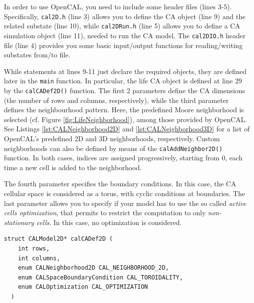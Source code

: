In order to use OpenCAL, you need to include some header files (lines
3-5). Specifically, \verb'cal2D.h' (line 3) allows you to define the
CA object (line 9) and the related substate (line 10), while
\verb'cal2DRun.h' (line 5) allows you to define a CA simulation object
(line 11), needed to run the CA model. The \verb'cal2DIO.h' header
file (line 4) provides you some basic input/output functions for
reading/writing substates from/to file.

While statements at lines 9-11 just declare the required objects, they
are defined later in the \verb'main' function. In particular, the life
CA object is defined at line 29 by the \verb'calCADef2D()'
function. The first 2 parameters define the CA dimensions (the number
of rows and columns, respectively), while the third parameter defines
the neighbourhood pattern. Here, the predefined Moore neighborhood is
selected (cf. Figure \ref{fig:LifeNeighborhood}), among those provided
by OpenCAL. See Listings \ref{lst:CALNeighborhood2D} and
\ref{lst:CALNeighborhood3D} for a list of OpenCAL's predefined 2D and
3D neighborhoods, respectively. Custom neighborhoods can also be
defined by means of the \verb'calAddNeighbor2D()' function. In both
cases, indices are assigned progressively, starting from 0, each time
a new cell is added to the neighborhood.

The fourth parameter specifies the boundary conditions. In this case,
the CA cellular space is considered as a torus, with cyclic conditions
at boundaries. The last parameter allows you to specify if your model
has to use the so called \emph{active cells optimization}, that
permits to restrict the computation to only \emph{non-stationary
  cells}. In this case, no optimization is considered.

\begin{lstlisting}[float,floatplacement=H, label=lst:calCADef2D, caption=Definition of the calCADef2D() function., numbers=none]
  struct CALModel2D* calCADef2D (
    int rows,
    int columns,
    enum CALNeighborhood2D CAL_NEIGHBORHOOD_2D,
    enum CALSpaceBoundaryCondition CAL_TOROIDALITY,
    enum CALOptimization CAL_OPTIMIZATION
  )
\end{lstlisting}  

